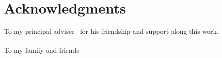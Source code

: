 \section*{Acknowledgments}

\begin{center}
\end{center}


To my principal adviser \firstAdvisorName\ for his friendship 
and support along this work. 
\\
\\
To my family and friends


\begin{center}
\end{center}

\begin{flushright}  
	\MakeUppercase{\authorName}
\end{flushright}  

\schoolName 
\\
\thesisDate

